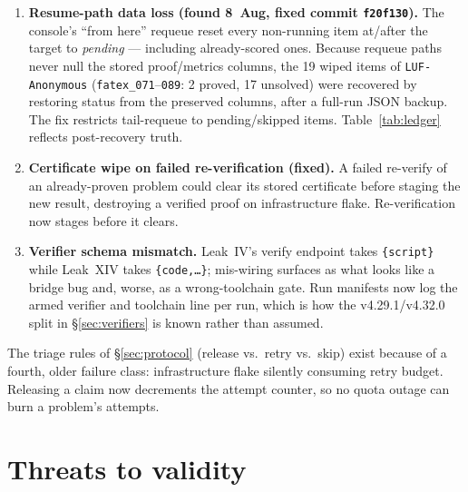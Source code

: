 \documentclass[12pt, a4paper]{article}
\newcommand{\run}[1]{\texttt{#1}}
\begin{document}
\begin{enumerate}[itemsep=2pt]
\item \textbf{Resume-path data loss (found 8~Aug, fixed commit
      \run{f20f130}).} The console's ``from here'' requeue reset every
      non-running item at/after the target to \emph{pending} --- including
      already-scored ones. Because requeue paths never null the stored
      proof/metrics columns, the 19 wiped items of \run{LUF-Anonymous}
      (\run{fatex\_071}--\run{089}: 2 proved, 17 unsolved) were recovered by
      restoring status from the preserved columns, after a full-run JSON
      backup. The fix restricts tail-requeue to pending/skipped items.
      Table~\ref{tab:ledger} reflects post-recovery truth.
\item \textbf{Certificate wipe on failed re-verification (fixed).} A failed
      re-verify of an already-proven problem could clear its stored
      certificate before staging the new result, destroying a verified proof
      on infrastructure flake. Re-verification now stages before it clears.
\item \textbf{Verifier schema mismatch.} Leak~IV's verify endpoint takes
      \run{\{script\}} while Leak~XIV takes \run{\{code,\dots\}}; mis-wiring
      surfaces as what looks like a bridge bug and, worse, as a
      wrong-toolchain gate. Run manifests now log the armed verifier and
      toolchain line per run, which is how the v4.29.1/v4.32.0 split in
      \S\ref{sec:verifiers} is known rather than assumed.
\end{enumerate}

The triage rules of \S\ref{sec:protocol} (release vs.\ retry vs.\ skip) exist
because of a fourth, older failure class: infrastructure flake silently
consuming retry budget. Releasing a claim now decrements the attempt counter,
so no quota outage can burn a problem's attempts.

\section{Threats to validity}
\label{sec:validity}
\end{document}
